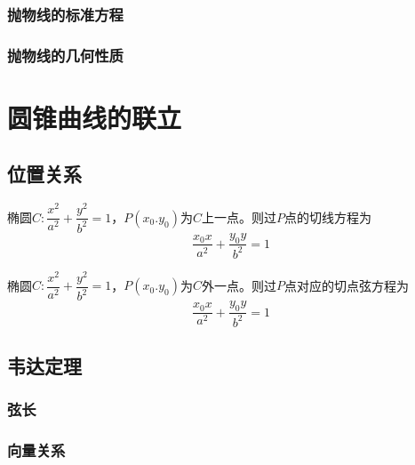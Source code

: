 \subsubsection{抛物线的标准方程}
\clearpage
\subsubsection{抛物线的几何性质}
\clearpage
\clearpage

\section{圆锥曲线的联立}
\subsection{位置关系}

\begin{theorem}
    椭圆\(C:\dfrac{x^2}{a^2}+\dfrac{y^2}{b^2}=1\)，\(P(x_0.y_0)\)为\(C\)上一点。则过\(P\)点的切线方程为
    \begin{equation}
        \dfrac{x_0x}{a^2}+\dfrac{y_0y}{b^2}=1
    \end{equation}
\end{theorem}
\begin{corollary}
    椭圆\(C:\dfrac{x^2}{a^2}+\dfrac{y^2}{b^2}=1\)，\(P(x_0.y_0)\)为\(C\)外一点。则过\(P\)点对应的切点弦方程为
    \begin{equation}
        \dfrac{x_0x}{a^2}+\dfrac{y_0y}{b^2}=1
    \end{equation}
\end{corollary}
















\clearpage
\subsection{韦达定理}
\subsubsection{弦长}
\clearpage
\subsubsection{向量关系}
\clearpage

